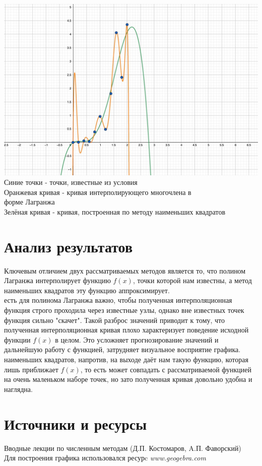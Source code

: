 \documentclass[a4paper, 14pt]{extreport}
\begin{document}
\includegraphics[width =\textwidth]{graphic}
Синие точки - точки, известные из условия \\
Оранжевая кривая - кривая интерполирующего многочлена в \\ форме Лагранжа \\
Зелёная кривая - кривая, построенная по методу наименьших квадратов

\section*{Анализ результатов}
\;\;\;\;\;\;Ключевым отличием двух рассматриваемых методов является то, что полином Лагранжа интерполирует функцию $f(x)$, точки которой нам известны, а метод наименьших квадратов эту функцию аппроксимирует. \\
 есть для полинома Лагранжа важно, чтобы полученная интерполяционная функция строго проходила через известные узлы, однако вне известных точек функция сильно "скачет". Такой разброс значений приводит к тому, что полученная интерполяционная кривая плохо характеризует поведение исходной функции $f(x)$ в целом. Это усложняет прогнозирование значений и дальнейшую работу с функцией, затрудняет визуальное восприятие графика.\\
 наименьших квадратов, напротив, на выходе даёт нам такую функцию, которая лишь приближает $f(x)$, то есть может совпадать с рассматриваемой функцией на очень маленьком наборе точек, но зато полученная кривая довольно удобна и наглядна. 

\section*{Источники и ресурсы}
Вводные лекции по численным методам (Д.П. Костомаров, A.П. Фаворский) \\
Для построения графика использовался ресурc \textit{www.geogebra.com}
\end{document}
